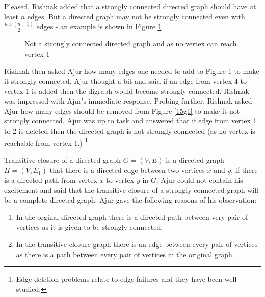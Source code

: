 Pleased, Rishnak added that a strongly connected directed graph should have at least $n$ edges. But a directed graph may not be strongly connected even with $\frac{n \times (n-1)}{2}$ edges - an example is shown in Figure \ref{15g3}
\begin{figure}
\begin{center}
\caption{ Not a strongly connected directed graph and as no vertex can reach vertex 1}\label{15g3}
\end{center}
\end{figure}

Rishnak then asked Ajur how many edges one needed to add to Figure \ref{15g3} to make it strongly connected. Ajur thought a bit and said if an edge from vertex 4 to vertex 1 is added then the digraph would become strongly connected. Rishnak was impressed with Ajur's immediate response. Probing further, Rishnak asked Ajur how many edges should be removed from Figure \ref{15g1} to make it not strongly connected. Ajur was up to task and answered that if edge from vertex 1 to 2 is deleted then the directed graph is not strongly connected (as no vertex is reachable from vertex 1.) \footnote{Edge deletion problems relate to edge failures and they have been well studied.}

Transitive closure of a directed graph $G=(V,E)$ is a directed graph $H=(V,E_1)$ that there is a directed edge between two vertices $x$ and $y$, if there is a directed path from vertex $x$ to vertex $y$ in $G$. Ajur could not contain his excitement and said that the transitive closure of a strongly connected graph will be a complete directed graph. Ajur gave the following reasons of his observation:
\begin{enumerate}
    \item In the orginal directed graph there is a directed path between very pair of vertices as it is given to be strongly connected.
    \item In the transitive closure graph there is an edge between every pair of vertices as there is a path between every pair of vertices in the original graph.
\end{enumerate}

